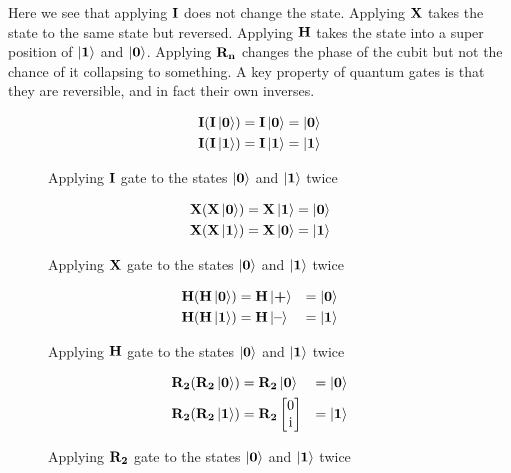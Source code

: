 \newpage
\noindent
Here we see that applying $\mathbf{I}$ does not change the state. Applying $\mathbf{X}$ takes the state to the same state but reversed. Applying $\mathbf{H}$ takes the state into a super position of $\ket{\mathbf{1}}$ and $\ket{\mathbf{0}}$. Applying $\mathbf{R_{n}}$ changes the phase of the cubit but not the chance of it collapsing to something. 
A key property of quantum gates is that they are reversible, and in fact their own inverses. 
\begin{figure}[H]
    \centering
    \begin{align*}
        \mathbf{I}(\mathbf{I}\ket{\mathbf{0}})&=\mathbf{I}\ket{\mathbf{0}}=\ket{\mathbf{0}}\\
        \mathbf{I}(\mathbf{I}\ket{\mathbf{1}})&=\mathbf{I}\ket{\mathbf{1}}=\ket{\mathbf{1}}
    \end{align*}
    \caption{Applying $\mathbf{I}$ gate to the states $\ket{\mathbf{0}}$ and $\ket{\mathbf{1}}$ twice}
    \label{fig:i2}
\end{figure}

\begin{figure}[H]
    \centering
    \begin{align*}
        \mathbf{X}(\mathbf{X}\ket{\mathbf{0}})&=\mathbf{X}\ket{\mathbf{1}}=\ket{\mathbf{0}}\\
        \mathbf{X}(\mathbf{X}\ket{\mathbf{1}})&=\mathbf{X}\ket{\mathbf{0}}=\ket{\mathbf{1}}
    \end{align*}
    \caption{Applying $\mathbf{X}$ gate to the states $\ket{\mathbf{0}}$ and $\ket{\mathbf{1}}$ twice}
    \label{fig:x2}
\end{figure}

\begin{figure}[H]
    \centering
    \begin{alignat*}{2}
        \mathbf{H}(\mathbf{H}\ket{\mathbf{0}})&=\mathbf{H}\ket{\textbf{+}}&=\ket{\mathbf{0}}\\
        \mathbf{H}(\mathbf{H}\ket{\mathbf{1}})&=\mathbf{H}\ket{\textbf{--}}&=\ket{\mathbf{1}}
    \end{alignat*}
    \caption{Applying $\mathbf{H}$ gate to the states $\ket{\mathbf{0}}$ and $\ket{\mathbf{1}}$ twice}
    \label{fig:h2}
\end{figure}

\begin{figure}[H]
    \centering
    \begin{alignat*}{2}
        \mathbf{R_{2}}(\mathbf{R_{2}}\ket{\mathbf{0}})&=\mathbf{R_{2}}\ket{\mathbf{0}}&=\ket{\mathbf{0}}\\
        \mathbf{R_{2}}(\mathbf{R_{2}}\ket{\mathbf{1}})&=\mathbf{R_{2}}\begin{bmatrix}0\\\mathrm{i}\end{bmatrix}&=\ket{\mathbf{1}}\\
    \end{alignat*}
    \caption{Applying $\mathbf{R_{2}}$ gate to the states $\ket{\mathbf{0}}$ and $\ket{\mathbf{1}}$ twice}
    \label{fig:r22}
\end{figure}

